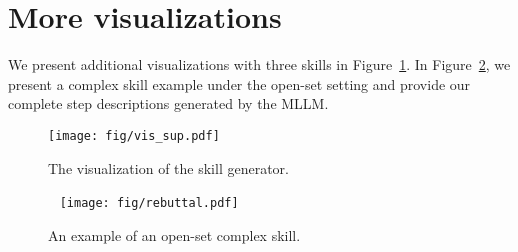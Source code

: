 \begin{table}[h]
\centering
{}
\caption{Hyperparameters for Video Generator.}
\label{tab:kcgsett}
\end{table}


\section{More visualizations}
\label{appendix vis}

We present additional visualizations with three skills in Figure~\ref{fig:vis sup}. In Figure~\ref{fig:rebuttal}, we present a complex skill example under the open-set setting and provide our complete step descriptions generated by the MLLM.

\begin{figure}[h]
  \centering
   \texttt{[image: fig/vis\_sup.pdf]}
   \caption{The visualization of the skill generator.}
   \label{fig:vis sup}
\end{figure}


\begin{figure}[t]  
  \centering
   \texttt{[image: fig/rebuttal.pdf]}
   \caption{An example of an open-set complex skill.}
   \label{fig:rebuttal}
\end{figure}
